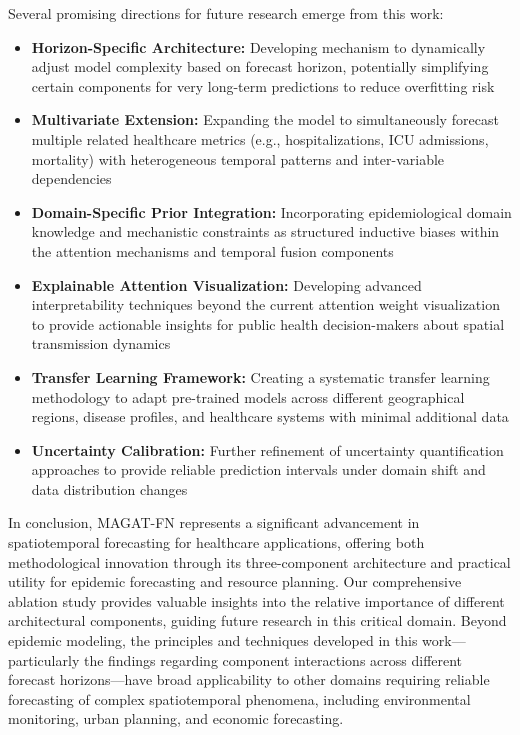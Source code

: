\documentclass[lettersize, journal]{IEEEtran}
\begin{document}
Several promising directions for future research emerge from this work:
\begin{itemize}
    \item \textbf{Horizon-Specific Architecture:} Developing mechanism to dynamically adjust model complexity based on forecast horizon, potentially simplifying certain components for very long-term predictions to reduce overfitting risk
    
    \item \textbf{Multivariate Extension:} Expanding the model to simultaneously forecast multiple related healthcare metrics (e.g., hospitalizations, ICU admissions, mortality) with heterogeneous temporal patterns and inter-variable dependencies
    
    \item \textbf{Domain-Specific Prior Integration:} Incorporating epidemiological domain knowledge and mechanistic constraints as structured inductive biases within the attention mechanisms and temporal fusion components
    
    \item \textbf{Explainable Attention Visualization:} Developing advanced interpretability techniques beyond the current attention weight visualization to provide actionable insights for public health decision-makers about spatial transmission dynamics
    
    \item \textbf{Transfer Learning Framework:} Creating a systematic transfer learning methodology to adapt pre-trained models across different geographical regions, disease profiles, and healthcare systems with minimal additional data
    
    \item \textbf{Uncertainty Calibration:} Further refinement of uncertainty quantification approaches to provide reliable prediction intervals under domain shift and data distribution changes
\end{itemize}

In conclusion, MAGAT-FN represents a significant advancement in spatiotemporal forecasting for healthcare applications, offering both methodological innovation through its three-component architecture and practical utility for epidemic forecasting and resource planning. Our comprehensive ablation study provides valuable insights into the relative importance of different architectural components, guiding future research in this critical domain. Beyond epidemic modeling, the principles and techniques developed in this work—particularly the findings regarding component interactions across different forecast horizons—have broad applicability to other domains requiring reliable forecasting of complex spatiotemporal phenomena, including environmental monitoring, urban planning, and economic forecasting.



\end{document}
